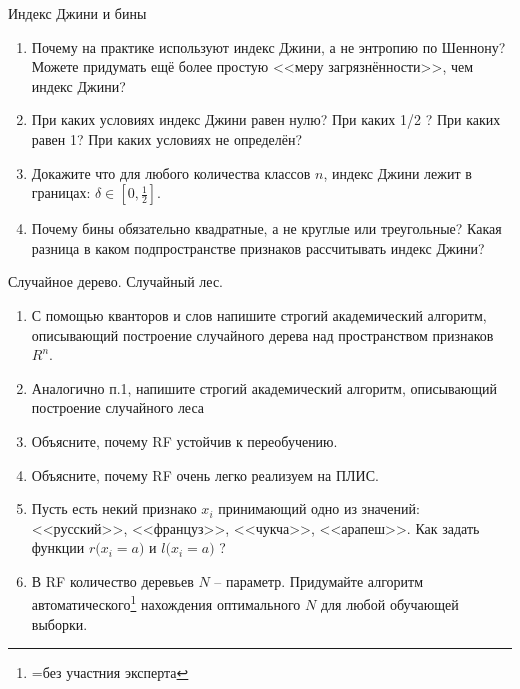 \documentclass{beamer}
\begin{document}
\begin{frame}{Индекс Джини и бины}
	\begin{enumerate}
	\item Почему на практике используют индекс Джини, а не энтропию по Шеннону? 
	Можете придумать ещё более простую <<меру загрязнённости>>, чем индекс Джини?
	\item При каких условиях индекс Джини равен нулю? При каких 1/2 ? 
	При каких равен 1? При каких условиях не определён?
	\item Докажите что для любого количества классов $n$, индекс Джини лежит в границах: $\delta \in [0, \frac{1}{2}]$.
	\item Почему бины обязательно квадратные, а не круглые или треугольные? Какая разница
	в каком подпространстве признаков рассчитывать индекс Джини? 	
	\end{enumerate}
\end{frame}



\begin{frame}{Случайное дерево. Случайный лес.}
	\begin{enumerate}
	\item С помощью кванторов и слов 
	напишите строгий академический алгоритм,
	описывающий построение случайного дерева 
	над пространством признаков $R^n$.
	\item Аналогично п.1, напишите 
	строгий академический алгоритм,
	описывающий построение случайного леса
	\item Объясните, почему RF устойчив к переобучению.
	\item Объясните, почему RF очень легко реализуем на ПЛИС.
	\item Пусть есть некий признако $x_i$ принимающий одно из значений: 
	<<русский>>, <<француз>>, <<чукча>>, <<арапеш>>. Как задать функции
	$r\big(x_i=a\big)$ и $l\big(x_i=a\big)$ ? 
	\item В RF количество деревьев $N$ -- параметр. 
	Придумайте алгоритм автоматического\footnote{=без участния эксперта} нахождения оптимального $N$
	для любой обучающей выборки.
	\end{enumerate} 
\end{frame} 
  
\end{document}
